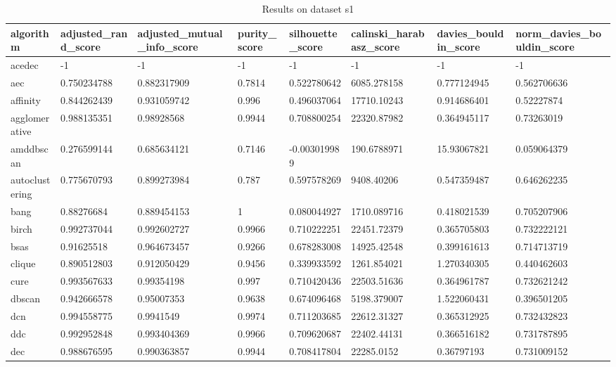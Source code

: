 \begin{table}[H]
\centering
\caption{Results on dataset s1}
\label{tab:params:s1}
\begin{tabular}{|l|l|l|l|l|l|l|l|}
\hline
algorithm & adjusted\_rand\_score & adjusted\_mutual\_info\_score & purity\_score & silhouette\_score & calinski\_harabasz\_score & davies\_bouldin\_score & norm\_davies\_bouldin\_score \\
\hline
acedec & -1 & -1 & -1 & -1 & -1 & -1 & -1 \\
\hline
aec & 0.750234788 & 0.882317909 & 0.7814 & 0.522780642 & 6085.278158 & 0.777124945 & 0.562706636 \\
\hline
affinity & 0.844262439 & 0.931059742 & 0.996 & 0.496037064 & 17710.10243 & 0.914686401 & 0.52227874 \\
\hline
agglomerative & 0.988135351 & 0.98928568 & 0.9944 & 0.708800254 & 22320.87982 & 0.364945117 & 0.73263019 \\
\hline
amddbscan & 0.276599144 & 0.685634121 & 0.7146 & -0.003019989 & 190.6788971 & 15.93067821 & 0.059064379 \\
\hline
autoclustering & 0.775670793 & 0.899273984 & 0.787 & 0.597578269 & 9408.40206 & 0.547359487 & 0.646262235 \\
\hline
bang & 0.88276684 & 0.889454153 & 1 & 0.080044927 & 1710.089716 & 0.418021539 & 0.705207906 \\
\hline
birch & 0.992737044 & 0.992602727 & 0.9966 & 0.710222251 & 22451.72379 & 0.365705803 & 0.732222121 \\
\hline
bsas & 0.91625518 & 0.964673457 & 0.9266 & 0.678283008 & 14925.42548 & 0.399161613 & 0.714713719 \\
\hline
clique & 0.890512803 & 0.912050429 & 0.9456 & 0.339933592 & 1261.854021 & 1.270340305 & 0.440462603 \\
\hline
cure & 0.993567633 & 0.99354198 & 0.997 & 0.710420436 & 22503.51636 & 0.364961787 & 0.732621242 \\
\hline
dbscan & 0.942666578 & 0.95007353 & 0.9638 & 0.674096468 & 5198.379007 & 1.522060431 & 0.396501205 \\
\hline
dcn & 0.994558775 & 0.9941549 & 0.9974 & 0.711203685 & 22612.31327 & 0.365312925 & 0.732432823 \\
\hline
ddc & 0.992952848 & 0.993404369 & 0.9966 & 0.709620687 & 22402.44131 & 0.366516182 & 0.731787895 \\
\hline
dec & 0.988676595 & 0.990363857 & 0.9944 & 0.708417804 & 22285.0152 & 0.36797193 & 0.731009152 \\

\end{tabular}
\end{table}
